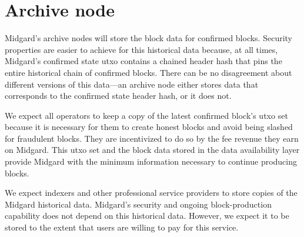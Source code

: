 \documentclass[../midgard.tex]{subfiles}
\begin{document}
\section{Archive node}
\label{h:archive-node}

Midgard's archive nodes will store the block data for confirmed blocks.
Security properties are easier to achieve for this historical data because, at all times, Midgard's confirmed state utxo contains a chained header hash that pins the entire historical chain of confirmed blocks.
There can be no disagreement about different versions of this data---an archive node either stores data that corresponds to the confirmed state header hash, or it does not.

We expect all operators to keep a copy of the latest confirmed block's utxo set because it is necessary for them to create honest blocks and avoid being slashed for fraudulent blocks.
They are incentivized to do so by the fee revenue they earn on Midgard.
This utxo set and the block data stored in the data availability layer provide Midgard with the minimum information necessary to continue producing blocks.

We expect indexers and other professional service providers to store copies of the Midgard historical data.
Midgard's security and ongoing block-production capability does not depend on this historical data. However, we expect it to be stored to the extent that users are willing to pay for this service.
\end{document}
